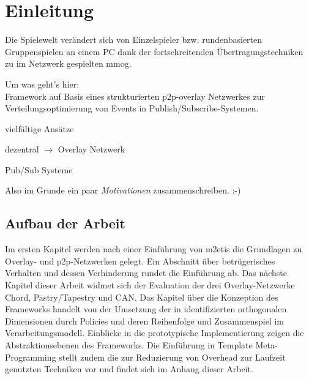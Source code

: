 \chapter{Einleitung}
\label{chap:einleitung}

Die Spielewelt verändert sich von Einzelspieler bzw. rundenbasierten Gruppenspielen an einem PC dank der fortschreitenden Übertragungstechniken zu im Netzwerk gespielten \ac{mmog}.

Um was geht's hier:\\
Framework auf Basis eines strukturierten p2p-overlay Netzwerkes zur Verteilungsoptimierung von Events in Publish/Subscribe-Systemen.

\begin{itemize*}
\item vielfältige Ansätze \cite{Bharambe2008Donnybrook} %
\item dezentral $\rightarrow$ Overlay Netzwerk
\item Pub/Sub Systeme \cite{Knutsson2004Peertopeer, Triebel2008Peertopeer} %
\end{itemize*}

Also im Grunde ein paar \emph{Motivationen} zusammenschreiben. :-)

\cite{Fischer2010Event, Fischer2010a} %

\section{Aufbau der Arbeit}
Im ersten Kapitel werden nach einer Einführung von \ac{m2etis} die Grundlagen zu Overlay- und p2p-Netzwerken gelegt. Ein Abschnitt über betrügerisches Verhalten und dessen Verhinderung rundet die Einführung ab. Das nächste Kapitel dieser Arbeit widmet sich der Evaluation der drei Overlay-Netzwerke Chord, Pastry/Tapestry und CAN. Das Kapitel über die Konzeption des Frameworks handelt von der Umsetzung der in \cite{Fischer2010Event} identifizierten orthogonalen Dimensionen durch Policies und deren Reihenfolge und Zusammenspiel im Verarbeitungsmodell. Einblicke in die prototypische Implementierung zeigen die Abstraktionsebenen des Frameworks. Die Einführung in Template Meta-Programming stellt zudem die zur Reduzierung von Overhead zur Laufzeit genutzten Techniken vor und findet sich im Anhang dieser Arbeit.
